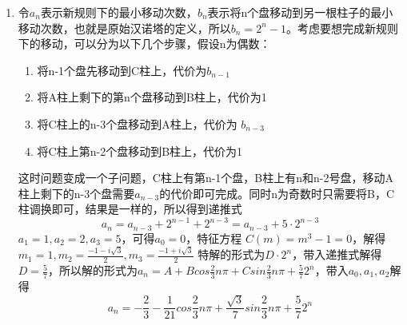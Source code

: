 \documentclass[a4paper]{article}
\begin{document}
\begin{enumerate}[]
\item 
\begin{solution}
    令$a_n$表示新规则下的最小移动次数，$b_n$表示将n个盘移动到另一根柱子的最小移动次数，也就是原始汉诺塔的定义，所以$b_n=2^n-1$。考虑要想完成新规则下的移动，可以分为以下几个步骤，假设n为偶数：
    \begin{enumerate}
        \item 将n-1个盘先移动到C柱上，代价为$b_{n-1}$
        \item 将A柱上剩下的第n个盘移动到B柱上，代价为1
        \item 将C柱上的n-3个盘移动到A柱上，代价为 $b_{n-3}$
        \item 将C柱上第n-2个盘移动到B柱上，代价为1
    \end{enumerate}
    这时问题变成一个子问题，C柱上有第n-1个盘，B柱上有n和n-2号盘，移动A柱上剩下的n-3个盘需要$a_{n-3}$的代价即可完成。同时n为奇数时只需要将B，C柱调换即可，结果是一样的，所以得到递推式
    \begin{equation*}
        a_n = a_{n-3} + 2^{n-1} + 2^{n-3} = a_{n-3} + 5 \cdot 2^{n-3}
    \end{equation*}
    $a_1=1,a_2=2,a_3=5 $，可得$a_0=0$，特征方程 $C(m)=m^3-1=0$，解得$m_1=1,m_2=\frac{-1-i\sqrt{3}}{2},m_3=\frac{-1+i\sqrt{3}}{2}$
    特解的形式为$D\cdot 2^n $，带入递推式解得$D=\frac{5}{7}$，所以解的形式为$a_n = A+Bcos \frac{2}{3} n \pi + C sin \frac{2}{3} n \pi + \frac{5}{7} 2^n$，带入$a_0,a_1,a_2$解得
    \begin{equation*}
        a_n = -\frac{2}{3} -\frac{1}{21} cos \frac{2}{3} n \pi + \frac{\sqrt{3}}{7} sin \frac{2}{3} n \pi + \frac{5}{7} 2^n
    \end{equation*}
\end{solution}


\end{enumerate}
\end{document}
